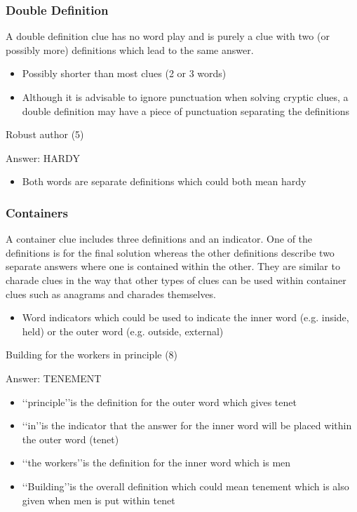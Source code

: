 \subsubsection{Double Definition}

A double definition clue has no word play and is purely a clue with two (or possibly more) definitions which lead to the same answer. 

\begin{itemize} 
	\item Possibly shorter than most clues (2 or 3 words) 
	\item Although it is advisable to ignore punctuation when solving cryptic clues, a double definition may have a piece of punctuation separating the definitions 
\end{itemize}


Robust author (5) 

Answer: HARDY 

\begin{itemize}
	\item Both words are separate definitions which could both mean hardy 
\end{itemize}

\subsubsection{Containers}

A container clue includes three definitions and an indicator. One of the definitions is for the final solution whereas the other definitions describe two separate answers where one is contained within the other. They are similar to charade clues in the way that other types of clues can be used within container clues such as anagrams and charades themselves.  

\begin{itemize} 
	\item Word indicators which could be used to indicate the inner word (e.g. inside, held) or the outer word (e.g. outside, external)
\end{itemize}


Building for the workers in principle (8)  

Answer: TENEMENT 

\begin{itemize}
	\item \lq\lq principle\rq\rq is the definition for the outer word which gives tenet 
	\item \lq\lq in\rq\rq is the indicator that the answer for the inner word will be placed within the outer word (tenet) 
	\item \lq\lq the workers\rq\rq is the definition for the inner word which is men 
	\item \lq\lq Building\rq\rq is the overall definition which could mean tenement which is also given when men is put within tenet 
\end{itemize}

